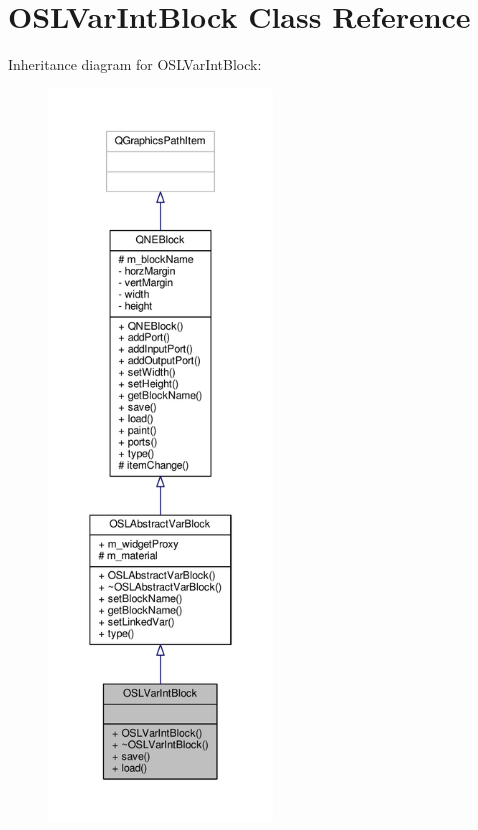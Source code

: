 \hypertarget{class_o_s_l_var_int_block}{\section{O\-S\-L\-Var\-Int\-Block Class Reference}
\label{class_o_s_l_var_int_block}
}


Inheritance diagram for O\-S\-L\-Var\-Int\-Block\-:
\nopagebreak
\begin{figure}[H]
\begin{center}
\leavevmode
\includegraphics[height=550pt]{class_o_s_l_var_int_block__inherit__graph}
\end{center}
\end{figure}


